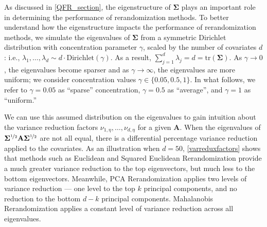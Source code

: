 \documentclass[11pt,twoside]{article}
\theoremstyle{definition}
\theoremstyle{remark}
\begin{document}
As discussed in \cref{QFR_section}, the eigenstructure of $\mathbf{\Sigma}$ plays an important role in determining the performance of rerandomization methods. To better understand how the eigenstructure impacts the performance of rerandomization methods, we simulate the eigenvalues of $\mathbf{\Sigma}$ from a symmetric Dirichlet distribution with concentration parameter $\gamma$, scaled by the number of covariates $d$: i.e., $\lambda_1, \dots, \lambda_d \sim d \cdot \text{Dirichlet}(\gamma)$. As a result, $\sum_{j=1}^d \lambda_j = d = \text{tr}(\mathbf{\Sigma})$. As $\gamma \to 0$, the eigenvalues become sparser and as $\gamma \to \infty$, the eigenvalues are more uniform; we consider concentration values $\gamma \in \{0.05, 0.5, 1\}$. In what follows, we refer to $\gamma = 0.05$ as ``sparse'' concentration, $\gamma = 0.5$ as ``average'', and $\gamma = 1$ as ``uniform.''


We can use this assumed distribution on the eigenvalues to gain intuition about the variance reduction factors $\nu_{1, \eta}, \ldots, \nu_{d, \eta}$ for a given $\mathbf{A}$. When the eigenvalues of $\mathbf{\Sigma}^{\nicefrac{1}{2}} \mathbf{A} \mathbf{\Sigma}^{\nicefrac{1}{2}}$ are not all equal, there is a differential percentage variance reduction applied to the covariates. As an illustration when $d = 50$, \cref{varreduxfactors} shows that methods such as Euclidean and Squared Euclidean Rerandomization provide a much greater variance reduction to the top eigenvectors, but much less to the bottom eigenvectors. Meanwhile, PCA Rerandomization applies two levels of variance reduction --- one level to the top $k$ principal components, and no reduction to the bottom $d - k$ principal components. Mahalanobis Rerandomization applies a constant level of variance reduction across all eigenvalues. 
\end{document}
